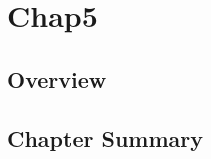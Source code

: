 \chapter{Chap5}
\label{cha:5}
\section{Overview}
\label{sec:ch5overview}
\section{Chapter Summary}
\label{sec:ch5summary}

